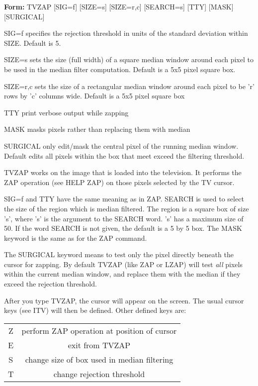 \begin{command}
  \item[\textbf{Form: }TVZAP {[SIG=f]} {[SIZE=s]} {[SIZE=r,c]} 
       {[SEARCH=s]} {[TTY]} {[MASK]} {[SURGICAL]}\hfill]{}
  \item[SIG=f]{specifies the rejection threshold in units
       of the standard deviation within SIZE.  Default is 5}.
  \item[SIZE=s]{sets the size (full width) of a square median
       window around each pixel to be used in the median filter
       computation.  Default is a 5x5 pixel square box.}
  \item[SIZE=r,c]{sets the size of a rectangular median window
       around each pixel to be 'r' rows by 'c' columns wide.  Default
       is a 5x5 pixel square box}
  \item[TTY]{print verbose output while zapping}
  \item[MASK]{masks pixels rather than replacing them with median}
  \item[SURGICAL]{only edit/mask the central pixel of the running
       median window.  Default edits all pixels within the box that
       meet exceed the filtering threshold.}
\end{command}

TVZAP works on the image that is loaded into the television.  It performs
the ZAP operation (see HELP ZAP) on those pixels selected by the TV cursor.

SIG=f and TTY have the same meaning as in ZAP.  SEARCH is used to select
the size of the region which is median filtered.  The region is a square
box of size 's', where 's' is the argument to the SEARCH word. 's' has a
maximum size of 50.  If the word SEARCH is not given, the default is a 5 by
5 box.  The MASK keyword is the same as for the ZAP command.

The SURGICAL keyword means to test only the pixel directly beneath the
cursor for zapping.  By default TVZAP (like ZAP or LZAP) will test 
\textit{all} pixels within the current median window, and replace them
with the median if they exceed the rejection threshold.

After you type TVZAP, the cursor will appear on the screen.  The usual
cursor keys (see ITV) will then be defined.  Other defined keys are:

\begin{tabular}{cc}
   Z&perform ZAP operation at position of cursor\\
   E&exit from TVZAP\\
   S&change size of box used in median filtering\\
   T&change rejection threshold\\
\end{tabular}

